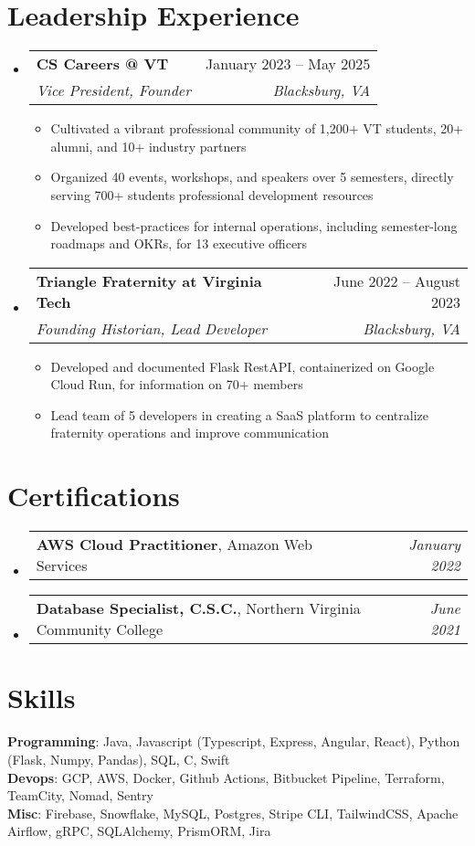 \documentclass[letterpaper,10pt]{article}
\makeatletter
\newcommand{\resumeItem}[1]{
  \item\small{
    {#1 \vspace{-3pt}}
  }
}
\newcommand{\resumeSubheading}[4]{
  \vspace{-2pt}\item
    \begin{tabular*}{0.97\textwidth}[t]{l@{\extracolsep{\fill}}r}
      \textbf{#1} & #2 \\
      \textit{\small#3} & \textit{\small #4} \\
    \end{tabular*}\vspace{-7pt}
}
\newcommand{\resumeCertification}[3]{
    \item
    \begin{tabular*}{0.97\textwidth}{l@{\extracolsep{\fill}}r}
      {\small \textbf{#1}, {#2}} & \textit{\small #3} \\
    \end{tabular*}\vspace{-7pt}
}
\newcommand{\resumeSubHeadingListStart}{\begin{itemize}[leftmargin=0.15in, label={}]}
\newcommand{\resumeSubHeadingListEnd}{\end{itemize}}
\newcommand{\resumeItemListStart}{\begin{itemize}}
\newcommand{\resumeItemListEnd}{\end{itemize}\vspace{-5pt}}
\makeatother
\begin{document}
\section{Leadership Experience}
  \resumeSubHeadingListStart

    \resumeSubheading
      {CS Careers @ VT}{January 2023 -- May 2025}
      {Vice President, Founder}{Blacksburg, VA}
      \resumeItemListStart
        \resumeItem{Cultivated a vibrant professional community of 1,200+ VT students, 20+ alumni, and 10+ industry partners}
        \resumeItem{Organized 40 events, workshops, and speakers over 5 semesters, directly serving 700+ students professional development resources}
        \resumeItem{Developed best-practices for internal operations, including semester-long roadmaps and OKRs, for 13 executive officers}
      \resumeItemListEnd
      
    \resumeSubheading
      {Triangle Fraternity at Virginia Tech}{June 2022 -- August 2023}
      {Founding Historian, Lead Developer}{Blacksburg, VA}
      \resumeItemListStart
        \resumeItem{Developed and documented Flask RestAPI, containerized on Google Cloud Run, for information on 70+ members}
        \resumeItem{Lead team of 5 developers in creating a SaaS platform to centralize fraternity operations and improve communication}
        \resumeItemListEnd

  \resumeSubHeadingListEnd

  \section{Certifications}
  \resumeSubHeadingListStart
  \resumeCertification
    {AWS Cloud Practitioner}{Amazon Web Services}{January 2022}
    \resumeCertification
    {Database Specialist, C.S.C.}{Northern Virginia Community College}{June 2021}
  \resumeSubHeadingListEnd
  
  
  \section{Skills}
   \begin{itemize}[leftmargin=0.15in, label={}]
      \small{\item{
      \vspace{1mm}
       \textbf{Programming}{: Java, Javascript (Typescript, Express, Angular, React), Python (Flask, Numpy, Pandas), SQL, C, Swift} \\
       \textbf{Devops}{: GCP, AWS, Docker, Github Actions, Bitbucket Pipeline, Terraform, TeamCity, Nomad, Sentry} \\
       \textbf{Misc}{: Firebase, Snowflake, MySQL, Postgres, Stripe CLI, TailwindCSS, Apache Airflow, gRPC, SQLAlchemy, PrismORM, Jira} \\
  
      }}
  
   \end{itemize}
\end{document}

